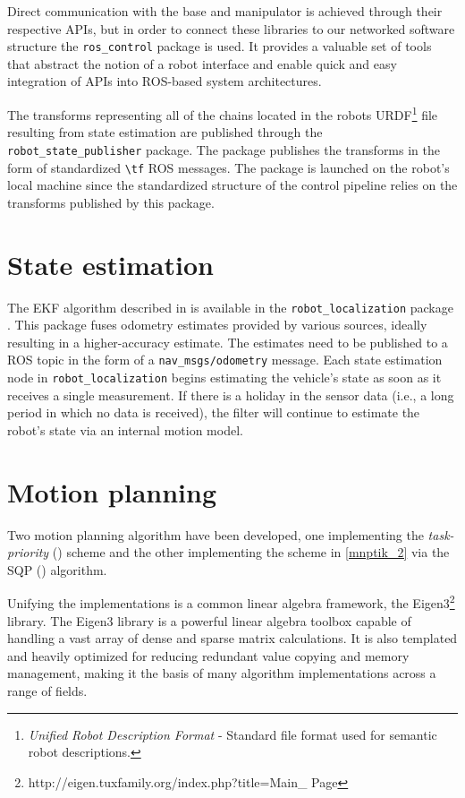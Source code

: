 \documentclass[times, utf8, diplomski, english]{fer}
\begin{document}
Direct communication with the base and manipulator is achieved through their respective APIs, but in order to connect these libraries to our networked software structure the \verb|ros_control| package is used. 
It provides a valuable set of tools that abstract the notion of a robot interface and enable quick and easy integration of APIs into ROS-based system architectures.

The transforms representing all of the chains located in the robots URDF\footnote{\textit{Unified Robot Description Format} - Standard file format used for semantic robot descriptions.} file resulting from state estimation are published through the \verb|robot_state_publisher| package. The package publishes the transforms in the form of standardized \verb|\tf| ROS messages.
The package is launched on the robot's local machine since the standardized structure of the control pipeline relies on the transforms published by this package.

\section{State estimation}\label{section:code state estimation}
The EKF algorithm described in  is available in the \verb|robot_localization| package \citep{MooreStouchKeneralizedEkf2014}.
This package fuses odometry estimates provided by various sources, ideally resulting in a higher-accuracy estimate.
The estimates need to be published to a ROS topic in the form of a \verb|nav_msgs/odometry| message.
Each state estimation node in \verb|robot_localization| begins estimating the vehicle’s state as soon as it receives a single measurement. If there is a holiday in the sensor data (i.e., a long period in which no data is received), the filter will continue to estimate the robot’s state via an internal motion model.

\section{Motion planning}\label{section:code motion planning}
Two motion planning algorithm have been developed, one implementing the \textit{task-priority} () scheme and the other implementing the scheme in \eqref{mnptik_2} via the SQP () algorithm.

Unifying the implementations is a common linear algebra framework, the Eigen3\footnote{http://eigen.tuxfamily.org/index.php?title=Main\_ Page} library.
The Eigen3 library is a powerful linear algebra toolbox capable of handling a vast array of dense and sparse matrix calculations.
It is also templated and heavily optimized for reducing redundant value copying and memory management, making it the basis of many algorithm implementations across a range of fields.
\end{document}
